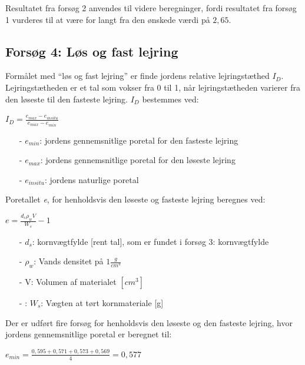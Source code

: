 Resultatet fra forsøg 2 anvendes til videre beregninger, fordi resultatet fra forsøg 1 vurderes til at være for langt fra den ønskede værdi på $2,\!65$.

\subsection{Forsøg 4: Løs og fast lejring}
Formålet med “løs og fast lejring” er finde jordens relative lejringstæthed $I_D$. Lejringstætheden er et tal som vokser fra 0 til 1, når lejringstætheden varierer fra den løseste til den fasteste lejring.
\newline
\newline
$I_D$ bestemmes ved:

\begin{center}
	$I_D = \frac{e_{max} - e_{in situ}}{e_{max} - e_{min}}$
\end{center}

\begin{itemize}
	\item[-] $e_{min}$: jordens gennemsnitlige poretal for den fasteste lejring 
	\item[-] $e_{max}$: jordens gennemsnitlige poretal for den løseste lejring
	\item[-] $e_{in situ}$: jordens naturlige poretal 
\end{itemize}

Poretallet \textit{e}, for henholdsvis den løseste og fasteste lejring beregnes ved:

\begin{center}
	$e = \frac{d_s \rho_w  V}{W_s} - 1$
\end{center}

\begin{itemize}
	\item[-] $d_s$: kornvægtfylde [rent tal], som er fundet i forsøg 3: kornvægtfylde 
	\item[-] $\rho_w$: Vands densitet på $1 \frac{g}{cm^3}$
	\item[-] V: Volumen af materialet $[cm^3]$
	\item[-]: $W_s$: Vægten at tørt kornmateriale [g]
\end{itemize}

Der er udført fire forsøg for henholdsvis den løseste og den fasteste lejring, hvor jordens gennemsnitlige poretal er beregnet til:

\begin{center}
	$e_{min} = \frac{0,\!595 + 0,\!571 + 0,\!573 + 0,\!569}{4} = 0,\!577$
\end{center}

